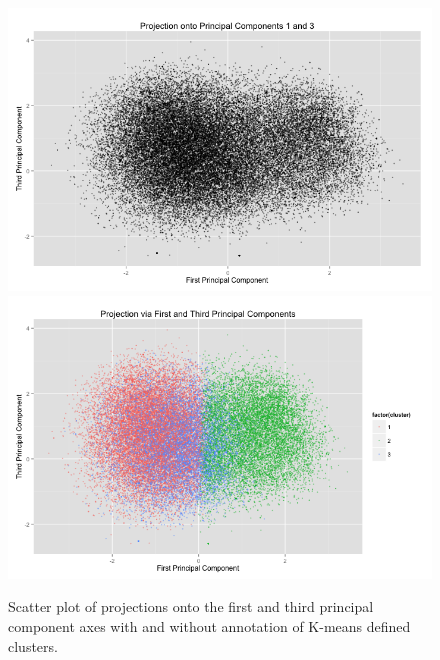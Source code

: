\documentclass[english]{article}\usepackage{graphicx, color}
\numberwithin{equation}{section}
\numberwithin{figure}{section}
\begin{document}
\begin{figure}
\begin{center}
\includegraphics[scale = .3]{PCA13bw.png}
\includegraphics[scale = .3]{PCA13c.png}
\caption{Scatter plot of projections onto the first and third principal component axes with and without annotation of K-means defined clusters.}
\end{center}
\end{figure}
\end{document}
